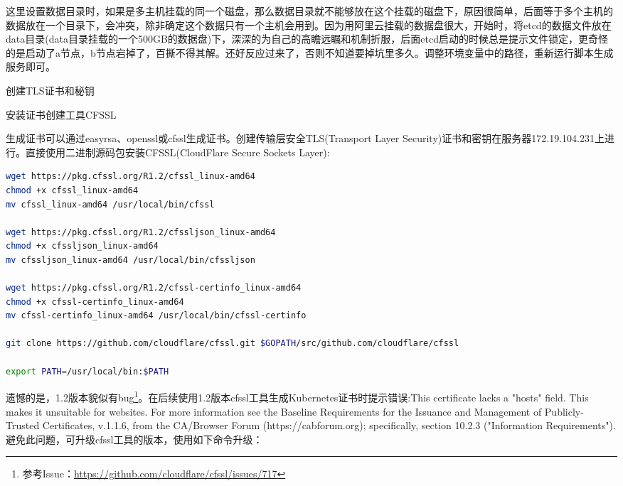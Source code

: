 \documentclass[8pt]{book}
\makeatletter
\numberwithin{dummy}{section}
\theoremstyle{ocrenumbox}
\theoremstyle{blacknumex}
\theoremstyle{blacknumbox}
\theoremstyle{ocrenum}
\renewcommand{\subsubsection}{\@startsection {subsubsection}{3}{\z@}
	{-2ex \@plus -0.1ex \@minus -.2ex}
	{.2ex \@plus.2ex }
	{\normalfont\small\sffamily\bfseries}}
\renewcommand\paragraph{\@startsection{paragraph}{4}{\z@}
	{-2ex \@plus-.2ex \@minus .2ex}
	{.1ex}
	{\normalfont\small\sffamily\bfseries}}
\makeatother
\begin{document}
这里设置数据目录时，如果是多主机挂载的同一个磁盘，那么数据目录就不能够放在这个挂载的磁盘下，原因很简单，后面等于多个主机的数据放在一个目录下，会冲突，除非确定这个数据只有一个主机会用到。因为用阿里云挂载的数据盘很大，开始时，将etcd的数据文件放在data目录(data目录挂载的一个500GB的数据盘)下，深深的为自己的高瞻远瞩和机制折服，后面etcd启动的时候总是提示文件锁定，更奇怪的是启动了a节点，b节点宕掉了，百撕不得其解。还好反应过来了，否则不知道要掉坑里多久。调整环境变量中的路径，重新运行脚本生成服务即可。


\subsubsection{创建TLS证书和秘钥}


\paragraph{安装证书创建工具CFSSL}

生成证书可以通过easyrsa、openssl或cfssl生成证书。创建传输层安全TLS(Transport Layer Security)证书和密钥在服务器172.19.104.231上进行。直接使用二进制源码包安装CFSSL(CloudFlare Secure Sockets Layer):

\begin{lstlisting}[language=Bash]
wget https://pkg.cfssl.org/R1.2/cfssl_linux-amd64
chmod +x cfssl_linux-amd64
mv cfssl_linux-amd64 /usr/local/bin/cfssl

wget https://pkg.cfssl.org/R1.2/cfssljson_linux-amd64
chmod +x cfssljson_linux-amd64
mv cfssljson_linux-amd64 /usr/local/bin/cfssljson

wget https://pkg.cfssl.org/R1.2/cfssl-certinfo_linux-amd64
chmod +x cfssl-certinfo_linux-amd64
mv cfssl-certinfo_linux-amd64 /usr/local/bin/cfssl-certinfo

git clone https://github.com/cloudflare/cfssl.git $GOPATH/src/github.com/cloudflare/cfssl

export PATH=/usr/local/bin:$PATH
\end{lstlisting}

遗憾的是，1.2版本貌似有bug\footnote{参考Issue：\url{https://github.com/cloudflare/cfssl/issues/717}}。在后续使用1.2版本cfssl工具生成Kubernetes证书时提示错误:This certificate lacks a "hosts" field. This makes it unsuitable for
websites. For more information see the Baseline Requirements for the Issuance and Management
of Publicly-Trusted Certificates, v.1.1.6, from the CA/Browser Forum (https://cabforum.org);
specifically, section 10.2.3 ("Information Requirements").避免此问题，可升级cfssl工具的版本，使用如下命令升级：
\end{document}
